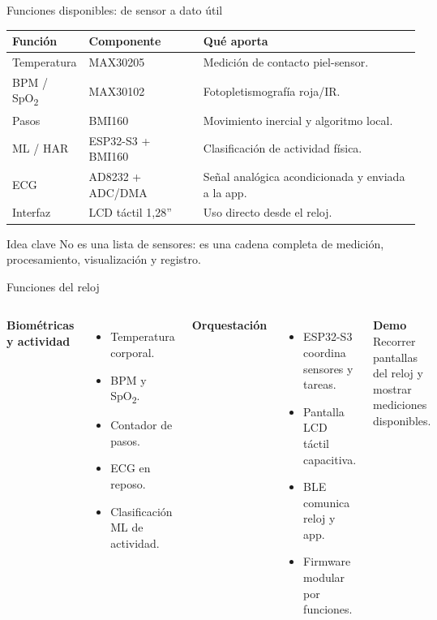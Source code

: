 \documentclass[aspectratio=169, 10pt]{beamer}
\newcommand{\demolabel}{\textcolor{accent}{\textbf{Demo}}}
\begin{document}
\begin{frame}{Funciones disponibles: de sensor a dato útil}
    \scriptsize
    \centering
    \renewcommand{\arraystretch}{1.25}
    \begin{tabular}{p{2.5cm}p{3.3cm}p{5.7cm}}
        \toprule
        \textbf{Función} & \textbf{Componente} & \textbf{Qué aporta} \\
        \midrule
        Temperatura & MAX30205 & Medición de contacto piel-sensor. \\
        BPM / SpO\textsubscript{2} & MAX30102 & Fotopletismografía roja/IR. \\
        Pasos & BMI160 & Movimiento inercial y algoritmo local. \\
        ML / HAR & ESP32-S3 + BMI160 & Clasificación de actividad física. \\
        ECG & AD8232 + ADC/DMA & Señal analógica acondicionada y enviada a la app. \\
        Interfaz & LCD táctil 1,28'' & Uso directo desde el reloj. \\
        \bottomrule
    \end{tabular}
    \vspace{0.35cm}
    \begin{block}{Idea clave}
        \scriptsize No es una lista de sensores: es una cadena completa de medición, procesamiento, visualización y registro.
    \end{block}
\end{frame}

\begin{frame}{Funciones del reloj}
    \footnotesize
    \begin{columns}[T]
        \textbf{Biométricas y actividad}
        \begin{itemize}\itemsep0.12cm
            \item Temperatura corporal.
            \item BPM y SpO\textsubscript{2}.
            \item Contador de pasos.
            \item ECG en reposo.
            \item Clasificación ML de actividad.
        \end{itemize}
        \textbf{Orquestación}
        \begin{itemize}\itemsep0.12cm
            \item ESP32-S3 coordina sensores y tareas.
            \item Pantalla LCD táctil capacitiva.
            \item BLE comunica reloj y app.
            \item Firmware modular por funciones.
        \end{itemize}
        \vspace{0.18cm}
        \begin{block}{\demolabel}
            Recorrer pantallas del reloj y mostrar mediciones disponibles.
        \end{block}
    \end{columns}
\end{frame}
\end{document}
